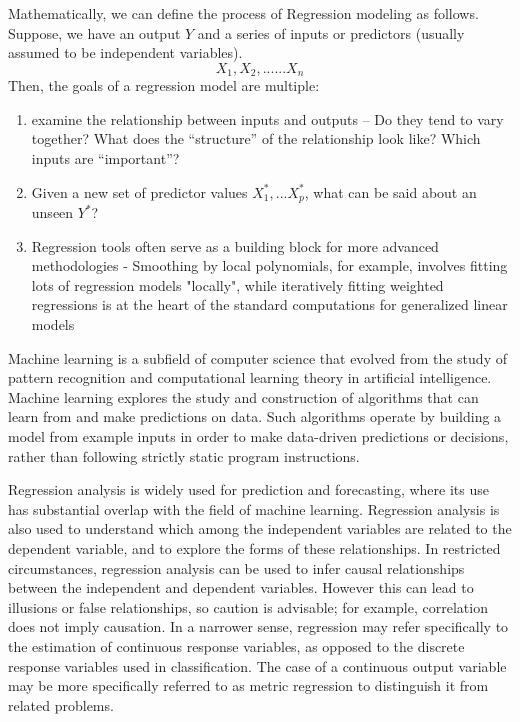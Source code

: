 \documentclass[letterpaper,12pt,titlepage,oneside,final]{report}
\begin{document}
        Mathematically, we can define the process of Regression modeling as follows. Suppose, we have an output $Y$ and a series of inputs or predictors (usually assumed to be independent variables). $$X_1, X_2, ...... X_n$$
        Then, the goals of a regression model are multiple:
        \begin{enumerate}
            \item {examine the relationship between inputs and outputs -- Do they tend to vary together? What does the “structure” of the relationship look like? Which inputs are “important”?}
            \item{ Given a new set of predictor values $X^{*}_1,...X^{*}_p$, what can be said about an unseen $Y^{*}$?}
            \item { Regression tools often serve as a building block for more advanced methodologies - Smoothing by local polynomials, for example, involves fitting lots of regression models "locally", while iteratively fitting weighted regressions is at the heart of the standard computations for generalized linear models}
        \end{enumerate}
        Machine learning is a subfield of computer science that evolved from the study of pattern recognition and computational learning theory in artificial intelligence. Machine learning explores the study and construction of algorithms that can learn from and make predictions on data. Such algorithms operate by building a model from example inputs in order to make data-driven predictions or decisions, rather than following strictly static program instructions.

        Regression analysis is widely used for prediction and forecasting, where its use has substantial overlap with the field of machine learning. Regression analysis is also used to understand which among the independent variables are related to the dependent variable, and to explore the forms of these relationships. In restricted circumstances, regression analysis can be used to infer causal relationships between the independent and dependent variables. However this can lead to illusions or false relationships, so caution is advisable; for example, correlation does not imply causation. In a narrower sense, regression may refer specifically to the estimation of continuous response variables, as opposed to the discrete response variables used in classification. The case of a continuous output variable may be more specifically referred to as metric regression to distinguish it from related problems.
        \clearpage
        
\end{document}
